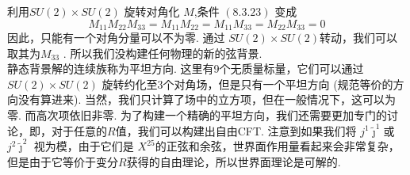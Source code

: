 利用$S U(2) \times S U(2)$ 旋转对角化 $M$,条件 $(8.3 .23)$ 变成
\begin{equation}
	M_{11} M_{22} M_{33}=M_{11} M_{22}=M_{11} M_{33}=M_{22} M_{33}=0
\end{equation}
因此，只能有一个对角分量可以不为零. 通过 $S U(2) \times S U(2)$转动，我们可以取其为$M_{33} $ . 所以我们没构建任何物理的新的弦背景.\\
静态背景解的连续族称为平坦方向. 这里有9个无质量标量，它们可以通过 $S U(2) \times S U(2)$ 旋转约化至3个对角场，但是只有一个平坦方向 (规范等价的方向没有算进来). 当然，我们只计算了场中的立方项，但在一般情况下，这可以为零. 而高次项依旧非零. 为了构建一个精确的平坦方向，我们还需要更加专门的讨论，即，对于任意的$R$值，我们可以构建出自由CFT. 注意到如果我们将 $j^{1} \tilde{\jmath}^{1}$或 $j^{2} \tilde{\jmath}^{2}$ 视为模，由于它们是 $X^{25}$的正弦和余弦，世界面作用量看起来会非常复杂，但是由于它等价于变分$R$获得的自由理论，所以世界面理论是可解的.

